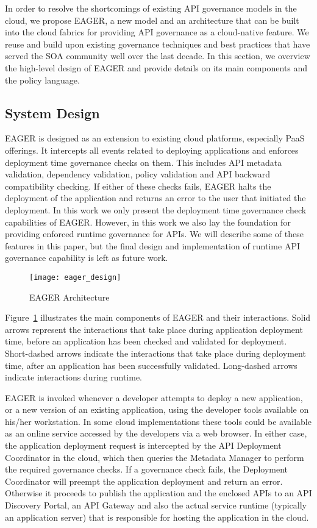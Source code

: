 In order to resolve the shortcomings of existing API governance models in the cloud, we propose EAGER, a new model and an architecture
that can be built into the cloud fabrics for providing API governance as a cloud-native feature. We reuse and build upon existing governance
techniques and best practices that have served the SOA community well over the last decade. In this section, we overview the high-level
design of EAGER and provide details on its main components and the policy language.

\subsection{System Design}
EAGER is designed as an extension to existing cloud platforms, especially PaaS offerings. It intercepts all events related to deploying applications
and enforces deployment time governance checks on them. This includes API metadata validation, dependency validation, policy validation and 
API backward compatibility
checking. If either of these checks fails, EAGER halts the deployment of the application and returns an error to the user that initiated the deployment.
In this work we only present the deployment time governance check capabilities of EAGER. However, in this work we also lay the foundation for
providing enforced runtime governance for APIs. We will describe some of these features in this paper, but the final design and implementation of
runtime API governance capability is left as future work.

\begin{figure}
\centering
\texttt{[image: eager\_design]}
\caption{EAGER Architecture}
\label{fig:eager_design}
\end{figure}

Figure~\ref{fig:eager_design} illustrates the main components of EAGER and their interactions. Solid arrows represent the interactions that take
place during application deployment time, before an application has been checked and validated for deployment. Short-dashed arrows indicate
the interactions that take place during deployment time, after an application has been successfully validated. Long-dashed arrows indicate
interactions during runtime.

EAGER is invoked whenever a developer attempts to deploy a new application, or a new version of an existing application, using the developer
tools available on his/her workstation. In some cloud implementations these tools could be available as an online service accessed by the 
developers via a web browser. In either case, the application deployment request is intercepted by the API Deployment Coordinator in the cloud, which
then queries the Metadata Manager to perform the required governance checks. If a governance check fails, the Deployment Coordinator
will preempt the application deployment and return an error. Otherwise it proceeds to publish the application and the enclosed APIs to an
API Discovery Portal, an API Gateway and also the actual service runtime (typically an application server) that is responsible for hosting
the application in the cloud. 

